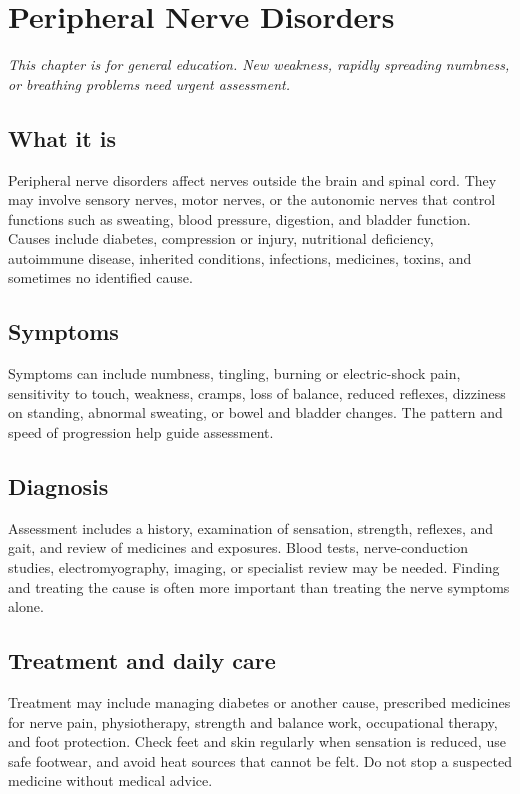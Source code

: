 \chapter{Peripheral Nerve Disorders}

\medskip
\noindent\textit{This chapter is for general education. New weakness, rapidly spreading numbness, or breathing problems need urgent assessment.}

\section*{What it is}
Peripheral nerve disorders affect nerves outside the brain and spinal cord. They may involve sensory nerves, motor nerves, or the autonomic nerves that control functions such as sweating, blood pressure, digestion, and bladder function. Causes include diabetes, compression or injury, nutritional deficiency, autoimmune disease, inherited conditions, infections, medicines, toxins, and sometimes no identified cause.

\section*{Symptoms}
Symptoms can include numbness, tingling, burning or electric-shock pain, sensitivity to touch, weakness, cramps, loss of balance, reduced reflexes, dizziness on standing, abnormal sweating, or bowel and bladder changes. The pattern and speed of progression help guide assessment.

\section*{Diagnosis}
Assessment includes a history, examination of sensation, strength, reflexes, and gait, and review of medicines and exposures. Blood tests, nerve-conduction studies, electromyography, imaging, or specialist review may be needed. Finding and treating the cause is often more important than treating the nerve symptoms alone.

\section*{Treatment and daily care}
Treatment may include managing diabetes or another cause, prescribed medicines for nerve pain, physiotherapy, strength and balance work, occupational therapy, and foot protection. Check feet and skin regularly when sensation is reduced, use safe footwear, and avoid heat sources that cannot be felt. Do not stop a suspected medicine without medical advice.

